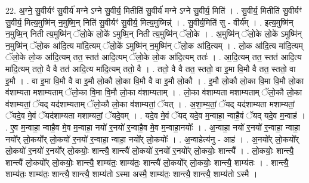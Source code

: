 \documentclass[17pt]{extarticle}
\begin{document}
22. अ॒ग्ने॒ सु॒वीर्यꣳ॑ सु॒वीर्य॑ मग्ने ऽग्ने सु॒वीर्य॒ मितीति॑ सु॒वीर्य॑ मग्ने ऽग्ने सु॒वीर्य॒ मिति॑ । . सु॒वीर्य॒ मितीति॑ सु॒वीर्यꣳ॑ सु॒वीर्य॒ मित्य॒मुष्मि॑न् न॒मुष्मि॒न् निति॑ सु॒वीर्यꣳ॑ सु॒वीर्य॒ मित्य॒मुष्मिन्न्॑ । . सु॒वीर्य॒मिति॑ सु - वीर्य᳚म् । . इत्य॒मुष्मि॑न् न॒मुष्मि॒न् निती त्य॒मुष्मि॑न् ॅलो॒के लो॒के॑ ऽमुष्मि॒न् निती त्य॒मुष्मि॑न् ॅलो॒के । . अ॒मुष्मि॑न् ॅलो॒के लो॒के॑ ऽमुष्मि॑न् न॒मुष्मि॑न् ॅलो॒क आ॑दि॒त्य मा॑दि॒त्यम् ॅलो॒के॑ ऽमुष्मि॑न् न॒मुष्मि॑न् ॅलो॒क आ॑दि॒त्यम् । . लो॒क आ॑दि॒त्य मा॑दि॒त्यम् ॅलो॒के लो॒क आ॑दि॒त्यम् तत॒ स्तत॑ आदि॒त्यम् ॅलो॒के लो॒क आ॑दि॒त्यम् ततः॑ । . आ॒दि॒त्यम् तत॒ स्तत॑ आदि॒त्य मा॑दि॒त्यम् ततो॒ वै वै तत॑ आदि॒त्य मा॑दि॒त्यम् ततो॒ वै । . ततो॒ वै वै तत॒ स्ततो॒ वा इ॒मा वि॒मौ वै तत॒ स्ततो॒ वा इ॒मौ । . वा इ॒मा वि॒मौ वै वा इ॒मौ लो॒कौ लो॒का वि॒मौ वै वा इ॒मौ लो॒कौ । . इ॒मौ लो॒कौ लो॒का वि॒मा वि॒मौ लो॒का व॑शाम्यता मशाम्यताम् ॅलो॒का वि॒मा वि॒मौ लो॒का व॑शाम्यताम् । . लो॒का व॑शाम्यता मशाम्यताम् ॅलो॒कौ लो॒का व॑शाम्यतां॒ ॅयद् यद॑शाम्यताम् ॅलो॒कौ लो॒का व॑शाम्यतां॒ ॅयत् । . अ॒शा॒म्य॒तां॒ ॅयद् यद॑शाम्यता मशाम्यतां॒ ॅयदे॒व मे॒वं ॅयद॑शाम्यता मशाम्यतां॒ ॅयदे॒वम् । . यदे॒व मे॒वं ॅयद् यदे॒व म॒न्वाहा॒ न्वाहै॒वं ॅयद् यदे॒व म॒न्वाह॑ । . ए॒व म॒न्वाहा॒ न्वाहै॒व मे॒व म॒न्वाहा॒ नयो॑ र॒नयो॑ र॒न्वाहै॒व मे॒व म॒न्वाहा॒नयोः᳚ । . अ॒न्वाहा॒ नयो॑ र॒नयो॑ र॒न्वाहा॒ न्वाहा॒ नयो᳚र् लो॒कयो᳚र् लो॒कयो॑ र॒नयो॑ र॒न्वाहा॒ न्वाहा॒ नयो᳚र् लो॒कयोः᳚ । . अ॒न्वाहेत्य॑नु - आह॑ । . अ॒नयो᳚र् लो॒कयो᳚र् लो॒कयो॑ र॒नयो॑ र॒नयो᳚र् लो॒कयोः॒ शान्त्यै॒ शान्त्यै॑ लो॒कयो॑ र॒नयो॑ र॒नयो᳚र् लो॒कयोः॒ शान्त्यै᳚ । . लो॒कयोः॒ शान्त्यै॒ शान्त्यै॑ लो॒कयो᳚र् लो॒कयोः॒ शान्त्यै॒ शाम्य॑तः॒ शाम्य॑तः॒ शान्त्यै॑ लो॒कयो᳚र् लो॒कयोः॒ शान्त्यै॒ शाम्य॑तः । . शान्त्यै॒ शाम्य॑तः॒ शाम्य॑तः॒ शान्त्यै॒ शान्त्यै॒ शाम्य॑तो ऽस्मा अस्मै॒ शाम्य॑तः॒ शान्त्यै॒ शान्त्यै॒ शाम्य॑तो ऽस्मै । \newline
\end{document}
